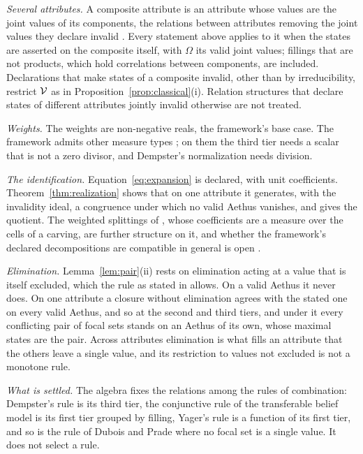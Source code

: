 \emph{Several attributes.} A composite attribute is an attribute whose values are the joint values of its components, the relations between attributes removing the joint values they declare invalid \cite{Aethus}. Every statement above applies to it when the states are asserted on the composite itself, with $\Omega$ its valid joint values; fillings that are not products, which hold correlations between components, are included. Declarations that make states of a composite invalid, other than by irreducibility, restrict $\mathcal{V}$ as in Proposition~\ref{prop:classical}(i). Relation structures that declare states of different attributes jointly invalid otherwise are not treated.

\emph{Weights.} The weights are non-negative reals, the framework's base case. The framework admits other measure types \cite{AethusTree}; on them the third tier needs a scalar that is not a zero divisor, and Dempster's normalization needs division.

\emph{The identification.} Equation~\eqref{eq:expansion} is declared, with unit coefficients. Theorem~\ref{thm:realization} shows that on one attribute it generates, with the invalidity ideal, a congruence under which no valid Aethus vanishes, and gives the quotient. The weighted splittings of \cite{AethusTree}, whose coefficients are a measure over the cells of a carving, are further structure on it, and whether the framework's declared decompositions are compatible in general is open \cite{Aethus, AethusTree}.

\emph{Elimination.} Lemma~\ref{lem:pair}(ii) rests on elimination acting at a value that is itself excluded, which the rule as stated in \cite{Aethus} allows. On a valid Aethus it never does. On one attribute a closure without elimination agrees with the stated one on every valid Aethus, and so at the second and third tiers, and under it every conflicting pair of focal sets stands on an Aethus of its own, whose maximal states are the pair. Across attributes elimination is what fills an attribute that the others leave a single value, and its restriction to values not excluded is not a monotone rule.

\emph{What is settled.} The algebra fixes the relations among the rules of combination: Dempster's rule is its third tier, the conjunctive rule of the transferable belief model is its first tier grouped by filling, Yager's rule is a function of its first tier, and so is the rule of Dubois and Prade where no focal set is a single value. It does not select a rule.

